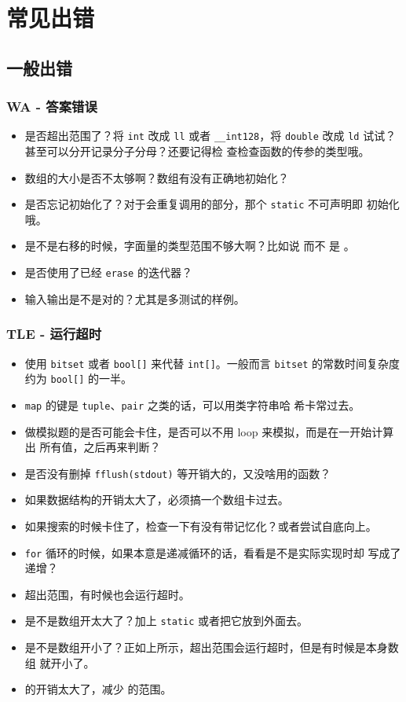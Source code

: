 \chapter{常见出错}
\section{一般出错}
\subsection{WA - 答案错误}
\begin{itemize}
    \item 是否超出范围了？将 \verb|int| 改成 \verb|ll| 或者 \verb|__int128|，将
        \verb|double| 改成 \verb|ld| 试试？甚至可以分开记录分子分母？还要记得检
        查检查函数的传参的类型哦。
    \item 数组的大小是否不太够啊？数组有没有正确地初始化？
    \item 是否忘记初始化了？对于会重复调用的部分，那个 \verb|static| 不可声明即
        初始化哦。
    \item 是不是右移的时候，字面量的类型范围不够大啊？比如说  而不
        是 。
    \item 是否使用了已经 \verb|erase| 的迭代器？
    \item 输入输出是不是对的？尤其是多测试的样例。
\end{itemize}

\subsection{TLE - 运行超时}
\begin{itemize}
    \item 使用 \verb|bitset| 或者 \verb|bool[]| 来代替 \verb|int[]|。一般而言
        \verb|bitset| 的常数时间复杂度约为 \verb|bool[]| 的一半。
    \item \verb|map| 的键是 \verb|tuple|、\verb|pair| 之类的话，可以用类字符串哈
        希卡常过去。
    \item 做模拟题的是否可能会卡住，是否可以不用 loop 来模拟，而是在一开始计算出
        所有值，之后再来判断？
    \item 是否没有删掉 \verb|fflush(stdout)| 等开销大的，又没啥用的函数？
    \item 如果数据结构的开销太大了，必须搞一个数组卡过去。
    \item 如果搜索的时候卡住了，检查一下有没有带记忆化？或者尝试自底向上。
    \item \verb|for| 循环的时候，如果本意是递减循环的话，看看是不是实际实现时却
        写成了递增？
    \item 超出范围，有时候也会运行超时。
    \item 是不是数组开太大了？加上 \verb|static| 或者把它放到外面去。
    \item 是不是数组开小了？正如上所示，超出范围会运行超时，但是有时候是本身数组
        就开小了。
    \item {} 的开销太大了，减少  的范围。
\end{itemize}

